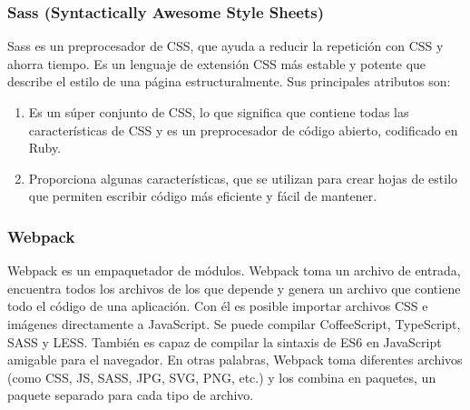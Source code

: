 

\subsubsection{Sass (Syntactically Awesome Style Sheets)}
Sass es un preprocesador de CSS, que ayuda a reducir la repetición con CSS y ahorra tiempo. Es un lenguaje de extensión CSS más estable y potente que describe el estilo de una página estructuralmente. Sus principales atributos son:
\begin{enumerate}
  \item Es un súper conjunto de CSS, lo que significa que contiene todas las características de CSS y es un preprocesador de código abierto, codificado en Ruby.
  \item Proporciona algunas características, que se utilizan para crear hojas de estilo que permiten escribir código más eficiente y fácil de mantener.
\end{enumerate}
\subsubsection{Webpack}
Webpack es un empaquetador de módulos. Webpack toma un archivo de entrada, encuentra todos los archivos de los que depende y genera un archivo que contiene todo el código de una aplicación. Con él es posible importar archivos CSS e imágenes directamente a JavaScript. Se puede compilar CoffeeScript, TypeScript, SASS y LESS. También es capaz de compilar la sintaxis de ES6 en JavaScript amigable para el navegador. En otras palabras, Webpack toma diferentes archivos (como CSS, JS, SASS, JPG, SVG, PNG, etc.) y los combina en paquetes, un paquete separado para cada tipo de archivo.



